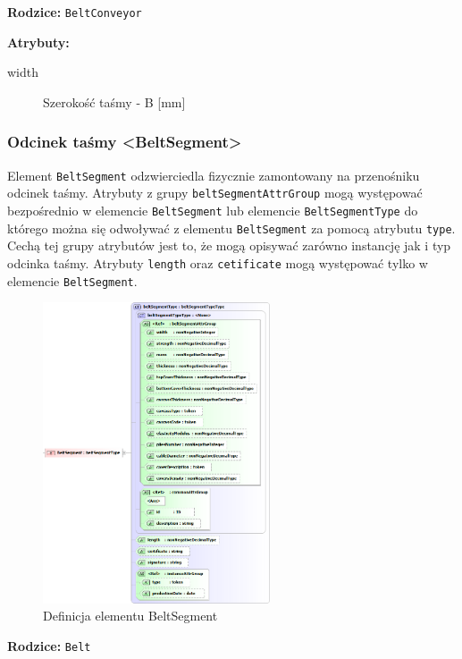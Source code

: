 \documentclass[12pt,a4paper]{article}
\begin{document}
\noindent\textbf{Rodzice:} \texttt{BeltConveyor}

\noindent\textbf{Atrybuty:}
\begin{description}
\item[width] Szerokość taśmy - B [mm]
\end{description}


\subsubsection{Odcinek taśmy <BeltSegment>}
Element {\tt BeltSegment} odzwierciedla fizycznie zamontowany na przenośniku
odcinek taśmy.  Atrybuty z grupy {\tt beltSegmentAttrGroup} mogą występować
bezpośrednio w elemencie {\tt BeltSegment} lub elemencie {\tt BeltSegmentType}
do którego można się odwoływać z elementu {\tt BeltSegment} za pomocą atrybutu
{\tt type}.  Cechą tej grupy atrybutów jest to, że mogą opisywać zarówno
instancję jak i typ odcinka taśmy. Atrybuty {\tt length} oraz {\tt cetificate}
mogą występować tylko w elemencie {\tt BeltSegment}.

\begin{figure}[H]
  \centering
  \includegraphics[width=0.6\textwidth]{png/liquid/BeltSegment}
  \caption{Definicja elementu BeltSegment}
  \label{fig:beltSegment-xsd}
\end{figure}

\noindent\textbf{Rodzice:} \texttt{Belt}
\end{document}
